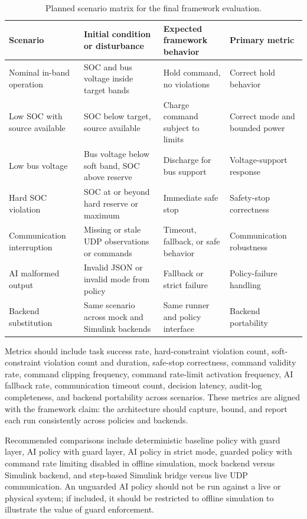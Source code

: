 \documentclass[conference]{IEEEtran}
\begin{document}
\begin{table}[t]
\caption{Planned scenario matrix for the final framework evaluation.}
\label{tab:scenarios}
\centering
\small
\begin{tabular}{|p{}|p{}|p{}|p{}|}
\hline
\textbf{Scenario} & \textbf{Initial condition or disturbance} &
\textbf{Expected framework behavior} & \textbf{Primary metric} \\
\hline
Nominal in-band operation & SOC and bus voltage inside target bands &
Hold command, no violations & Correct hold behavior \\
\hline
Low SOC with source available & SOC below target, source available &
Charge command subject to limits & Correct mode and bounded power \\
\hline
Low bus voltage & Bus voltage below soft band, SOC above reserve &
Discharge for bus support & Voltage-support response \\
\hline
Hard SOC violation & SOC at or beyond hard reserve or maximum &
Immediate safe stop & Safety-stop correctness \\
\hline
Communication interruption & Missing or stale UDP observations or commands &
Timeout, fallback, or safe behavior & Communication robustness \\
\hline
AI malformed output & Invalid JSON or invalid mode from policy &
Fallback or strict failure & Policy-failure handling \\
\hline
Backend substitution & Same scenario across mock and Simulink backends &
Same runner and policy interface & Backend portability \\
\hline
\end{tabular}
\end{table}

Metrics should include task success rate, hard-constraint violation count,
soft-constraint violation count and duration, safe-stop correctness, command
validity rate, command clipping frequency, command rate-limit activation
frequency, AI fallback rate, communication timeout count, decision latency,
audit-log completeness, and backend portability across scenarios. These
metrics are aligned with the framework claim: the architecture should capture,
bound, and report each run consistently across policies and backends.

Recommended comparisons include deterministic baseline policy with guard
layer, AI policy with guard layer, AI policy in strict mode, guarded policy
with command rate limiting disabled in offline simulation, mock backend versus
Simulink backend, and step-based Simulink bridge versus live UDP
communication. An unguarded AI policy should not be run against a live or
physical system; if included, it should be restricted to offline simulation to
illustrate the value of guard enforcement.
\end{document}

